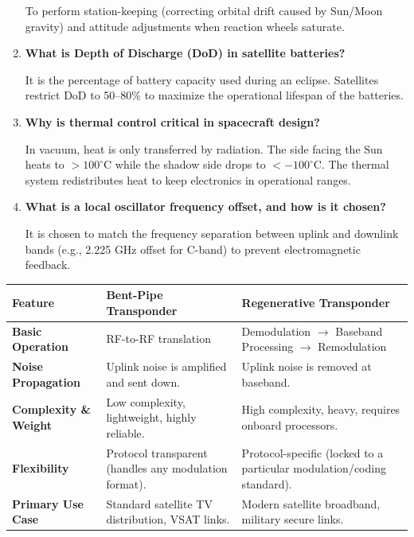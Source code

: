 \documentclass[12pt,a4paper]{article}
\newcommand{\Q}[1]{\textbf{#1}\par\noindent\ignorespaces}
\renewcommand{\arraystretch}{1.45}
\begin{document}
\begin{tcolorbox}[exambox, title={\textbf{Frequently Asked / Viva Questions}}]
\begin{enumerate}[topsep=0pt, label=\textbf{Q\arabic*.}, itemsep=5pt]
    To perform station-keeping (correcting orbital drift caused by Sun/Moon gravity) and attitude adjustments when reaction wheels saturate.
  \item \Q{What is Depth of Discharge (DoD) in satellite batteries?}
    It is the percentage of battery capacity used during an eclipse. Satellites restrict DoD to 50--80\% to maximize the operational lifespan of the batteries.
  \item \Q{Why is thermal control critical in spacecraft design?}
    In vacuum, heat is only transferred by radiation. The side facing the Sun heats to $>100^\circ\text{C}$ while the shadow side drops to $<-100^\circ\text{C}$. The thermal system redistributes heat to keep electronics in operational ranges.
  \item \Q{What is a local oscillator frequency offset, and how is it chosen?}
    It is chosen to match the frequency separation between uplink and downlink bands (e.g., 2.225 GHz offset for C-band) to prevent electromagnetic feedback.
\end{enumerate}
\end{tcolorbox}

\begin{tcolorbox}[tikzbox, title={Comparison of Transponder Architectures}]
\renewcommand{\arraystretch}{1.4}
\par\noindent
{\renewcommand{\arraystretch}{1.55}%
\begin{tabularx}{\linewidth}{|B{3.2cm}|Y|Y|}\hline
\textbf{Feature} & \textbf{\color{myteal}Bent-Pipe Transponder} & \textbf{\color{mypurple}Regenerative Transponder} \\[4pt]
\hline
\textbf{Basic Operation} & RF-to-RF translation & Demodulation $\to$ Baseband Processing $\to$ Remodulation \\[4pt]
\hline
\textbf{Noise Propagation} & Uplink noise is amplified and sent down. & Uplink noise is removed at baseband. \\[4pt]
\hline
\textbf{Complexity \& Weight} & Low complexity, lightweight, highly reliable. & High complexity, heavy, requires onboard processors. \\[4pt]
\hline
\textbf{Flexibility} & Protocol transparent (handles any modulation format). & Protocol-specific (locked to a particular modulation/coding standard). \\[4pt]
\hline
\textbf{Primary Use Case} & Standard satellite TV distribution, VSAT links. & Modern satellite broadband, military secure links. \\[4pt]
\hline
\end{tabularx}
}
\end{tcolorbox}
\end{document}
